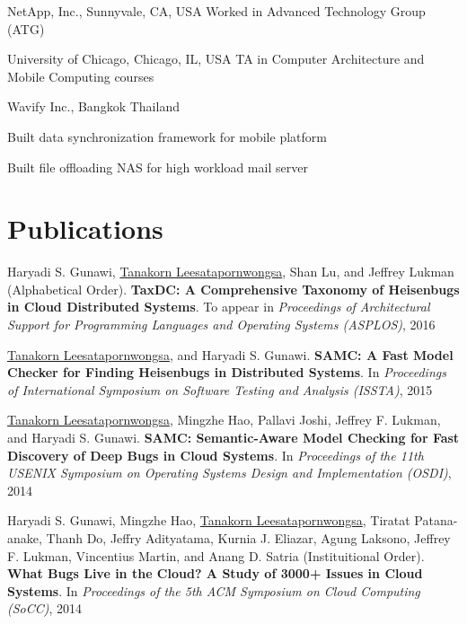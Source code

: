 \documentclass[10pt]{article} %
\begin{document}
{NetApp, Inc., Sunnyvale, CA, USA}
{Worked in Advanced Technology Group (ATG)} 

{University of Chicago, Chicago, IL, USA}
{TA in Computer Architecture and Mobile Computing courses} 

{Wavify Inc., Bangkok Thailand}
{\begin{minipage}{\smallertextwidth}
\begin{itemize-noindent}
\setlength\itemsep{-1ex}
\item Built data synchronization framework for mobile platform
\item Built file offloading NAS for high workload mail server
\end{itemize-noindent}
\end{minipage}}


\section{Publications}

Haryadi S. Gunawi, \underline{Tanakorn Leesatapornwongsa}, Shan Lu, and Jeffrey
Lukman (Alphabetical Order). \textbf{TaxDC: A Comprehensive Taxonomy of
Heisenbugs in Cloud Distributed Systems}. To appear in \textit{Proceedings of
Architectural Support for Programming Languages and Operating Systems
(ASPLOS)}, 2016 
\vspace{2mm}

\underline{Tanakorn Leesatapornwongsa}, and Haryadi S. Gunawi. \textbf{SAMC: A
Fast Model Checker for Finding Heisenbugs in Distributed Systems}. In
\textit{Proceedings of International Symposium on Software Testing and Analysis
(ISSTA)}, 2015
\vspace{2mm}

\underline{Tanakorn Leesatapornwongsa}, Mingzhe Hao, Pallavi Joshi, Jeffrey F.
Lukman, and Haryadi S. Gunawi. \textbf{SAMC: Semantic-Aware Model Checking for
Fast Discovery of Deep Bugs in Cloud Systems}. In \textit{Proceedings of the
11th USENIX Symposium on Operating Systems Design and Implementation (OSDI)},
2014
\vspace{2mm}

Haryadi S. Gunawi, Mingzhe Hao, \underline{Tanakorn Leesatapornwongsa}, Tiratat
Patana-anake, Thanh Do, Jeffry Adityatama, Kurnia J. Eliazar, Agung Laksono,
Jeffrey F. Lukman, Vincentius Martin, and Anang D. Satria (Instituitional Order).
\textbf{What Bugs Live in the Cloud? A Study of 3000+ Issues in Cloud Systems}.
In \textit{Proceedings of the 5th ACM Symposium on Cloud Computing (SoCC)}, 2014
\vspace{2mm}
\end{document}
